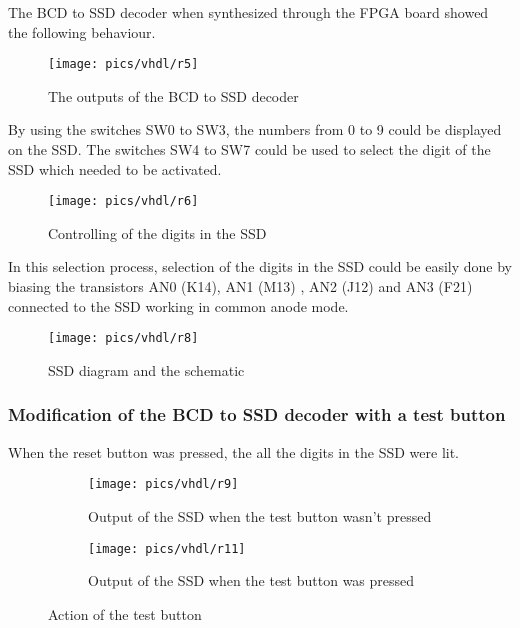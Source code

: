 \noindent
The BCD to SSD decoder when synthesized through the FPGA board showed the following behaviour. 

\begin{figure}[!h]
	\centering
	\texttt{[image: pics/vhdl/r5]}
	\caption{The outputs of the BCD to SSD decoder }
	\label{fig:r5}
\end{figure}

\noindent
By using the switches SW0 to SW3, the numbers from 0 to 9 could be displayed on the SSD. The switches SW4 to SW7 could be used to select the digit of the SSD which needed to be activated.  

\pagebreak

\begin{figure}[!h]
	\centering
	\texttt{[image: pics/vhdl/r6]}
	\caption{Controlling of the digits in the SSD}
	\label{fig:r6}
\end{figure}

\noindent
In this selection process, selection of the digits in the SSD could be easily done by biasing the transistors AN0 (K14), AN1 (M13) , AN2 (J12) and AN3 (F21) connected to the SSD working in common anode mode.

\begin{figure}[!h]
	\centering
	\texttt{[image: pics/vhdl/r8]}
	\caption{SSD diagram and the schematic}
	\label{fig:r8}
\end{figure}

\pagebreak

\subsubsection{Modification of the BCD to SSD decoder with a test button}

When the reset button was pressed, the all the digits in the SSD were lit.

\begin{figure}[!h]
	\centering
	\begin{subfigure}{.5\textwidth}
		\centering
		\texttt{[image: pics/vhdl/r9]}
		\caption{ Output of the SSD when the test button wasn't pressed}
		\label{fig:r9}
	\end{subfigure}%
	\begin{subfigure}{.5\textwidth}
		\centering
		\texttt{[image: pics/vhdl/r11]}
		\caption{Output of the SSD when the test button was pressed}
		\label{fig:r11}
	\end{subfigure}
	\caption{Action of the test button}
	\label{fig:r}
\end{figure}

